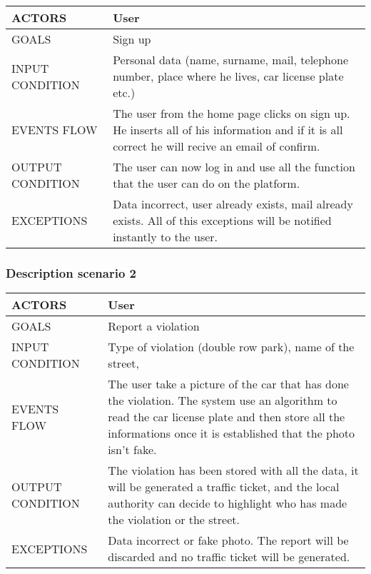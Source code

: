 \begin{center}
	\begin{tabular}{ | l | p{6cm} | } 
		\hline
		ACTORS & User  \\ 
		\hline
		GOALS & Sign up  \\ 
		\hline
		INPUT CONDITION & Personal data (name, surname, mail, telephone number, place where he lives, car license plate etc.)  \\ 
		\hline
		EVENTS FLOW & The user from the home page clicks on sign up. He inserts all of his information and if it is all correct he will recive an email of confirm.  \\ 
		\hline
		OUTPUT CONDITION & The user can now log in and use all the function that the user can do on the platform.  \\ 
		\hline
		EXCEPTIONS & Data incorrect, user already exists, mail already exists. All of this exceptions will be notified instantly to the user. \\ 
		\hline
	\end{tabular}
\end{center}

\subsubsection{Description scenario 2}

\begin{center}
	\begin{tabular}{ | l | p{6cm} | } 
		\hline
		ACTORS & User  \\ 
		\hline
		GOALS & Report a violation  \\ 
		\hline
		INPUT CONDITION & Type of violation (double row park), name of the street,  \\ 
		\hline
		EVENTS FLOW & The user take a picture of the car that has done the violation. The system use an algorithm to read the car license plate and then store all the informations once it is established that the photo isn't fake.  \\ 
		\hline
		OUTPUT CONDITION & The violation has been stored with all the data, it will be generated a traffic ticket, and the local authority can decide to highlight who has made the violation or the street. \\ 
		\hline
		EXCEPTIONS & Data incorrect or fake photo. The report will be discarded and no traffic ticket will be generated.  \\ 
		\hline
	\end{tabular}
\end{center}

